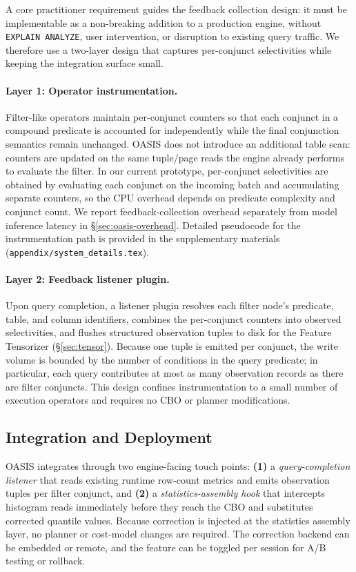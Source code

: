 \documentclass[runningheads]{llncs}
\begin{document}
A core practitioner requirement guides the feedback collection design: it must
be implementable as a non-breaking addition to a production engine, without
\texttt{EXPLAIN ANALYZE}, user intervention, or disruption to existing query
traffic. We therefore use a two-layer design that captures per-conjunct
selectivities while keeping the integration surface small.

\paragraph{Layer 1: Operator instrumentation.}
Filter-like operators maintain per-conjunct counters so that each conjunct in a
compound predicate is accounted for independently while the final conjunction
semantics remain unchanged. OASIS does not introduce an additional table scan:
counters are updated on the same tuple/page reads the engine already performs to
evaluate the filter. In our current prototype, per-conjunct selectivities are
obtained by evaluating each conjunct on the incoming batch and accumulating
separate counters, so the CPU overhead depends on predicate complexity and
conjunct count. We report feedback-collection overhead separately from model
inference latency in \S\ref{sec:oasis-overhead}.
Detailed pseudocode for the instrumentation path is provided in the
supplementary materials (\texttt{appendix/system\_details.tex}).

\paragraph{Layer 2: Feedback listener plugin.}
Upon query completion, a listener plugin resolves each filter node's predicate,
table, and column identifiers, combines the per-conjunct counters into observed
selectivities, and flushes structured observation tuples to disk for the Feature
Tensorizer (\S\ref{sec:tensor}). Because one tuple is emitted per conjunct, the
write volume is bounded by the number of conditions in the query predicate; in
particular, each query contributes at most as many observation records as there
are filter conjuncts. This design confines instrumentation to a small number of
execution operators and requires no CBO or planner modifications.

\subsection{Integration and Deployment}
\label{sec:integration}

OASIS integrates through two engine-facing touch points:
\textbf{(1)} a \emph{query-completion listener} that reads existing runtime
row-count metrics and emits observation tuples per filter conjunct, and
\textbf{(2)} a \emph{statistics-assembly hook} that intercepts histogram reads
immediately before they reach the CBO and substitutes corrected quantile values.
Because correction is injected at the statistics assembly layer, no planner or
cost-model changes are required. The correction backend can be embedded or
remote, and the feature can be toggled per session for A/B testing or rollback.
\end{document}
